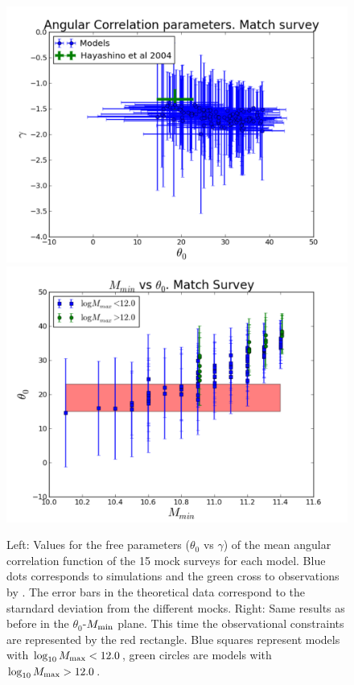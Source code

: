 \documentclass[usenatbib]{mn2e}
\begin{document}
\begin{figure}
\begin{center}
\includegraphics[width=0.46\linewidth,angle=0]{./plots/power_law_correlation.pdf} 
\hspace{5mm}  
\includegraphics[width=0.46\linewidth,angle=0]{./plots/mmin_vs_correlation.pdf} 
\end{center}
\caption{Left: Values for the free parameters ($\theta_{0}$ vs $\gamma$) of the 
mean angular correlation function of the 15 mock surveys for each
model. Blue dots corresponds to simulations and the green cross to
observations by \citet{Hayashino2004}. The error bars in the
theoretical data correspond to the starndard deviation from the
different mocks. Right: Same results as before in the
$\theta_{0}$-$M_{\rm min}$ plane. This time the observational
constraints are represented by the red rectangle. Blue squares
represent models with $\log_{10} M_{\rm  max}<12.0$, green circles are
models with $\log_{10} M_{\rm max}>12.0$.
\label{figure:correlation_parameters}}
\end{figure} 
\end{document}
